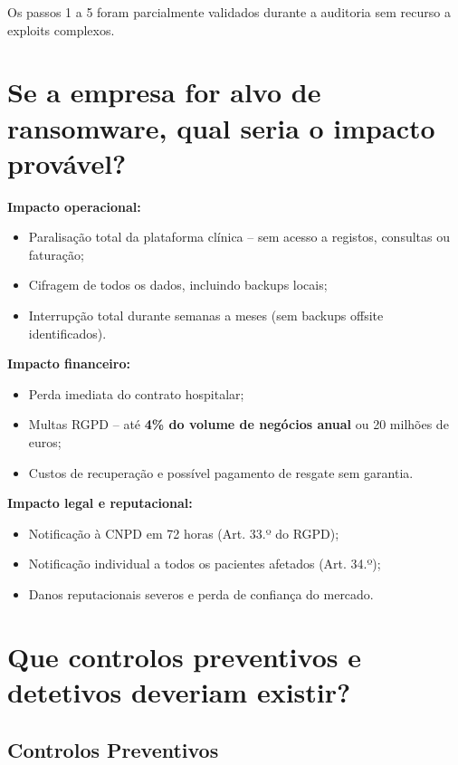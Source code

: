 \documentclass[12pt, a4paper]{report}
\begin{document}
Os passos 1 a 5 foram parcialmente validados durante a auditoria sem recurso a exploits complexos.

\section{Se a empresa for alvo de ransomware, qual seria o impacto provável?}

\textbf{Impacto operacional:}
\begin{itemize}[itemsep=2pt]
  \item Paralisação total da plataforma clínica -- sem acesso a registos, consultas ou faturação;
  \item Cifragem de todos os dados, incluindo backups locais;
  \item Interrupção total durante semanas a meses (sem backups offsite identificados).
\end{itemize}

\textbf{Impacto financeiro:}
\begin{itemize}[itemsep=2pt]
  \item Perda imediata do contrato hospitalar;
  \item Multas RGPD -- até \textbf{4\% do volume de negócios anual} ou 20 milhões de euros;
  \item Custos de recuperação e possível pagamento de resgate sem garantia.
\end{itemize}

\textbf{Impacto legal e reputacional:}
\begin{itemize}[itemsep=2pt]
  \item Notificação à CNPD em 72 horas (Art. 33.º do RGPD);
  \item Notificação individual a todos os pacientes afetados (Art. 34.º);
  \item Danos reputacionais severos e perda de confiança do mercado.
\end{itemize}

\section{Que controlos preventivos e detetivos deveriam existir?}

\subsection{Controlos Preventivos}
\end{document}
